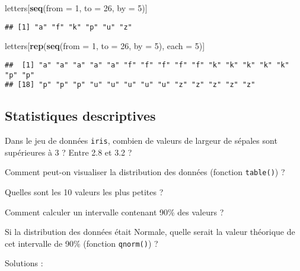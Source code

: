 \documentclass[]{book}
\newenvironment{Shaded}{\begin{snugshade}}{\end{snugshade}}
\newcommand{\KeywordTok}[1]{\textcolor[rgb]{0.13,0.29,0.53}{\textbf{#1}}}
\newcommand{\DataTypeTok}[1]{\textcolor[rgb]{0.13,0.29,0.53}{#1}}
\newcommand{\DecValTok}[1]{\textcolor[rgb]{0.00,0.00,0.81}{#1}}
\newcommand{\StringTok}[1]{\textcolor[rgb]{0.31,0.60,0.02}{#1}}
\newcommand{\OperatorTok}[1]{\textcolor[rgb]{0.81,0.36,0.00}{\textbf{#1}}}
\newcommand{\NormalTok}[1]{#1}
\theoremstyle{definition}
\theoremstyle{definition}
\theoremstyle{definition}
\theoremstyle{remark}
\begin{document}
\begin{Shaded}
\begin{Highlighting}[]
\NormalTok{letters[}\KeywordTok{seq}\NormalTok{(}\DataTypeTok{from =} \DecValTok{1}\NormalTok{, }\DataTypeTok{to =} \DecValTok{26}\NormalTok{, }\DataTypeTok{by =} \DecValTok{5}\NormalTok{)]}
\end{Highlighting}
\end{Shaded}

\begin{verbatim}
## [1] "a" "f" "k" "p" "u" "z"
\end{verbatim}

\begin{Shaded}
\begin{Highlighting}[]
\NormalTok{letters[}\KeywordTok{rep}\NormalTok{(}\KeywordTok{seq}\NormalTok{(}\DataTypeTok{from =} \DecValTok{1}\NormalTok{, }\DataTypeTok{to =} \DecValTok{26}\NormalTok{, }\DataTypeTok{by =} \DecValTok{5}\NormalTok{), }\DataTypeTok{each =} \DecValTok{5}\NormalTok{)]}
\end{Highlighting}
\end{Shaded}

\begin{verbatim}
##  [1] "a" "a" "a" "a" "a" "f" "f" "f" "f" "f" "k" "k" "k" "k" "k" "p" "p"
## [18] "p" "p" "p" "u" "u" "u" "u" "u" "z" "z" "z" "z" "z"
\end{verbatim}

\subsection{Statistiques
descriptives}\label{statistiques-descriptives-1}

Dans le jeu de données \texttt{iris}, combien de valeurs de largeur de
sépales sont supérieures à 3 ? Entre 2.8 et 3.2 ?

Comment peut-on visualiser la distribution des données (fonction
\texttt{table()}) ?

Quelles sont les 10 valeurs les plus petites ?

Comment calculer un intervalle contenant 90\% des valeurs ?

Si la distribution des données était Normale, quelle serait la valeur
théorique de cet intervalle de 90\% (fonction \texttt{qnorm()}) ?

Solutions :

\begin{Shaded}
\end{Shaded}
\end{document}
